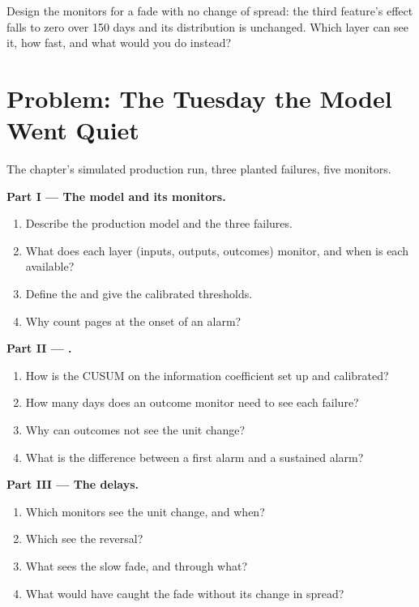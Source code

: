 \begin{exercise}[$\star\star\star$]\label{exo:ml:monitoring-and-retraining:8}
Design the monitors for a fade with no change of spread: the third feature's effect falls to zero over 150 days and its
distribution is unchanged. Which layer can see it, how fast, and what would you do instead?
\end{exercise}

\section{Problem: The Tuesday the Model Went Quiet}

\begin{problem}\label{pb:ml:monitoring-and-retraining:1}
The chapter's simulated production run, three planted failures, five monitors.

\medskip\noindent\textbf{Part I --- The model and its monitors.}
\begin{enumerate}
\item Describe the production model and the three failures.
\item What does each layer (inputs, outputs, outcomes) monitor, and when is each available?
\item Define the  and give the calibrated thresholds.
\item Why count pages at the onset of an alarm?
\end{enumerate}

\medskip\noindent\textbf{Part II --- .}
\begin{enumerate}[resume]
\item How is the CUSUM on the information coefficient set up and calibrated?
\item How many days does an outcome monitor need to see each failure?
\item Why can outcomes not see the unit change?
\item What is the difference between a first alarm and a sustained alarm?
\end{enumerate}

\medskip\noindent\textbf{Part III --- The delays.}
\begin{enumerate}[resume]
\item Which monitors see the unit change, and when?
\item Which see the reversal?
\item What sees the slow fade, and through what?
\item What would have caught the fade without its change in spread?
\end{enumerate}


\end{problem}
